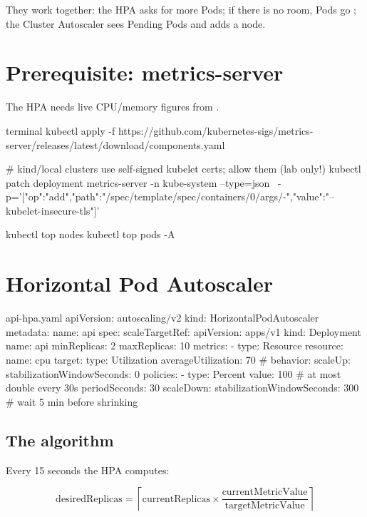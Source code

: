 They work together: the HPA asks for more Pods; if there is no room, Pods go
; the Cluster Autoscaler sees Pending Pods and adds a node.

\section{Prerequisite: metrics-server}

The HPA needs live CPU/memory figures from .

\begin{bashcode}{terminal}
kubectl apply -f https://github.com/kubernetes-sigs/metrics-server/releases/latest/download/components.yaml

# kind/local clusters use self-signed kubelet certs; allow them (lab only!)
kubectl patch deployment metrics-server -n kube-system --type=json \
  -p='[{"op":"add","path":"/spec/template/spec/containers/0/args/-","value":"--kubelet-insecure-tls"}]'

kubectl top nodes
kubectl top pods -A
\end{bashcode}

\section{Horizontal Pod Autoscaler}

\begin{yamlcode}{api-hpa.yaml}
apiVersion: autoscaling/v2
kind: HorizontalPodAutoscaler
metadata:
  name: api
spec:
  scaleTargetRef:
    apiVersion: apps/v1
    kind: Deployment
    name: api
  minReplicas: 2
  maxReplicas: 10
  metrics:
    - type: Resource
      resource:
        name: cpu
        target:
          type: Utilization
          averageUtilization: 70        # %
  behavior:
    scaleUp:
      stabilizationWindowSeconds: 0
      policies:
        - type: Percent
          value: 100                    # at most double every 30s
          periodSeconds: 30
    scaleDown:
      stabilizationWindowSeconds: 300   # wait 5 min before shrinking
\end{yamlcode}

\subsection{The algorithm}

Every 15 seconds the HPA computes:

\[
  \text{desiredReplicas} = \left\lceil \text{currentReplicas} \times
  \frac{\text{currentMetricValue}}{\text{targetMetricValue}} \right\rceil
\]

